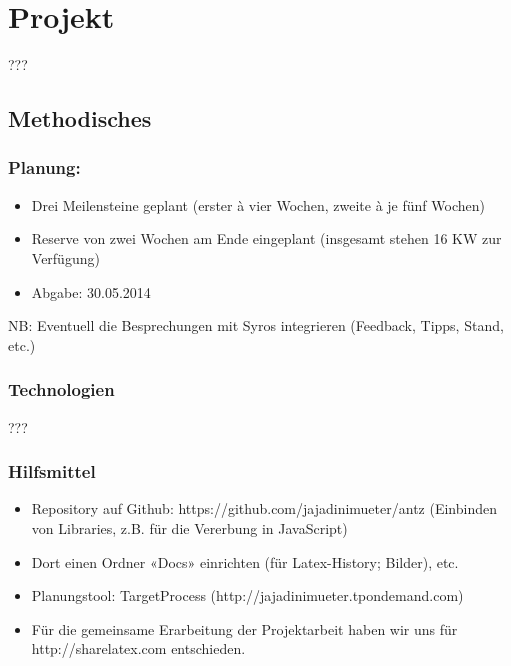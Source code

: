 
\chapter{Projekt}

???

\section{Methodisches}


\subsection*{Planung:}

\begin{itemize}[noitemsep]
\item Drei Meilensteine geplant (erster à vier Wochen, zweite à je fünf Wochen)
\item Reserve von zwei Wochen am Ende eingeplant (insgesamt stehen 16 KW zur Verfügung)
\item Abgabe: 30.05.2014
\end{itemize}

\vspace*{1cm}


NB: Eventuell die Besprechungen mit Syros integrieren (Feedback, Tipps, Stand, etc.)



\subsection{Technologien}

???


\subsection{Hilfsmittel}

\begin{itemize}[noitemsep]
\item Repository auf Github: https://github.com/jajadinimueter/antz (Einbinden von Libraries, z.B. für die Vererbung in JavaScript)
\item Dort einen Ordner «Docs» einrichten (für Latex-History; Bilder), etc.
\item Planungstool: TargetProcess (http://jajadinimueter.tpondemand.com)
\item Für die gemeinsame Erarbeitung der Projektarbeit haben wir uns für http://sharelatex.com entschieden.
\end{itemize}


\vspace*{1cm}


\cite[S. 115]{ds-ant}

